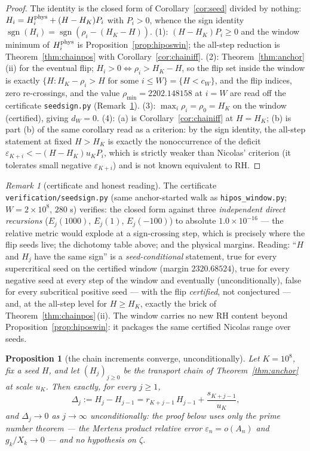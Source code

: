 \documentclass[11pt]{article}
\newtheorem{proposition}[theorem]{Proposition}
\theoremstyle{remark}
\newtheorem{remark}[theorem]{Remark}
\newcommand{\eps}{\varepsilon}
\DeclareMathOperator{\sgn}{sgn}
\begin{document}
\begin{proof}
The identity is the closed form of Corollary~\ref{cor:seed} divided by
nothing: $H_i=H^{\rm phys}_i+(H-H_K)P_i$ with $P_i>0$, whence the sign
identity $\sgn(H_i)=\sgn(\rho_i-(H_K-H))$. (1): $(H-H_K)P_i\ge0$ and the
window minimum of $H^{\rm phys}_i$ is Proposition~\ref{prop:hiposwin}; the
all-step reduction is Theorem~\ref{thm:chainpos} with
Corollary~\ref{cor:chainiff}. (2): Theorem~\ref{thm:anchor}\,(ii) for the
eventual flip; $H_i>0\iff\rho_i>H_K-H$, so the flip set inside the window
is exactly $\{H:H_K-\rho_i>H\text{ for some }i\le W\}=\{H<c_W\}$, and the
flip indices, zero re-crossings, and the value $\rho_{\min}=2202.148158$
at $i=W$ are read off the certificate \texttt{seedsign.py}
(Remark~\ref{rem:sgnnum}). (3): $\max_i\rho_i=\rho_0=H_K$ on the window
(certified), giving $d_W=0$. (4): (a) is
Corollary~\ref{cor:chainiff} at $H=H_K$; (b) is part (b) of the same
corollary read as a criterion: by the sign identity, the all-step
statement at fixed $H>H_K$ is exactly the nonoccurrence of the deficit
$\eps_{K+i}<-(H-H_K)u_KP_i$, which is strictly weaker than Nicolas'
criterion (it tolerates small negative $\eps_{K+i}$) and is not known
equivalent to RH.
\end{proof}

\begin{remark}[certificate and honest reading]\label{rem:sgnnum}
The certificate \texttt{verification/seedsign.py} (same anchor-started
walk as \texttt{hipos\_window.py}; $W=2\times10^8$, $280$ s) verifies: the
closed form against three \emph{independent direct recursions}
($E_j(1000)$, $E_j(1)$, $E_j(-100)$) to absolute $1.0\times10^{-16}$ ---
the relative metric would explode at a sign-crossing step, which is
precisely where the flip seeds live; the dichotomy table above; and the
physical margins. Reading: ``$H$ and $H_j$ have the same sign'' is a
\emph{seed-conditional} statement, true for every supercritical seed on
the certified window (margin $2320.68524$), true for every negative seed
at every step of the window and eventually (unconditionally), false for
every subcritical positive seed --- with the flip \emph{certified}, not
conjectured --- and, at the all-step level for $H\ge H_K$, exactly the
brick of Theorem~\ref{thm:chainpos}\,(ii). The window carries no new RH
content beyond Proposition~\ref{prop:hiposwin}: it packages the same
certified Nicolas range over seeds.
\end{remark}

\begin{proposition}[the chain increments converge, unconditionally]
\label{prop:stepdiff}
Let $K=10^8$, fix a seed $H$, and let $(H_j)_{j\ge0}$ be the transport
chain of Theorem~\ref{thm:anchor} at scale $u_K$. Then exactly, for
every $j\ge1$,
\[
\Delta_j:=H_j-H_{j-1}=r_{K+j-1}\,H_{j-1}+\frac{s_{K+j-1}}{u_K},
\]
and $\Delta_j\to0$ as $j\to\infty$ \emph{unconditionally}: the proof
below uses only the prime number theorem --- the Mertens product
relative error $\eps_n=o(A_n)$ and $g_k/X_k\to0$ --- and no hypothesis
on $\zeta$.
\end{proposition}
\end{document}
